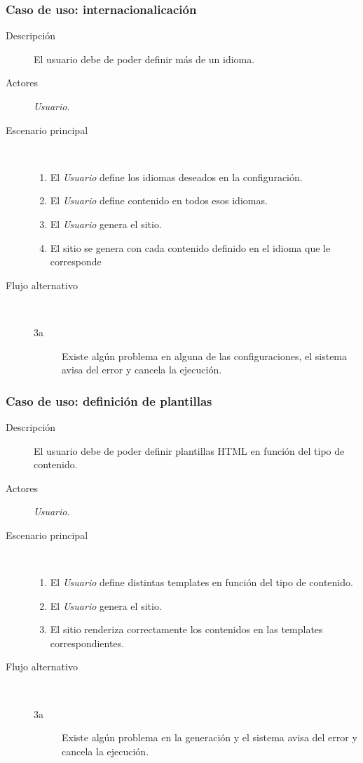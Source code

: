 \subsubsection{Caso de uso: internacionalicación}

\begin{description}
    \item[Descripción] El usuario debe de poder definir más de un idioma.
    \item[Actores] \textit{Usuario}.
    \item[Escenario principal] $\quad$
        \begin{enumerate}
            \item El \textit{Usuario} define los idiomas deseados en la configuración.
            \item El \textit{Usuario} define contenido en todos esos idiomas.
            \item El \textit{Usuario} genera el sitio.
            \item El sitio se genera con cada contenido definido en el idioma que le corresponde
        \end{enumerate}
    \item[Flujo alternativo] $\quad$
        \begin{description}
            \item[3a] Existe algún problema en alguna de las configuraciones, el sistema avisa del error
                y cancela la ejecución.
        \end{description}
\end{description}

\subsubsection{Caso de uso: definición de plantillas}

\begin{description}
    \item[Descripción] El usuario debe de poder definir plantillas HTML en función del tipo de contenido.
    \item[Actores] \textit{Usuario}.
    \item[Escenario principal] $\quad$
        \begin{enumerate}
            \item El \textit{Usuario} define distintas templates en función del tipo de contenido.
            \item El \textit{Usuario} genera el sitio.
            \item El sitio renderiza correctamente los contenidos en las templates correspondientes.
        \end{enumerate}
    \item[Flujo alternativo] $\quad$
        \begin{description}
            \item[3a] Existe algún problema en la generación y el sistema avisa del error
                y cancela la ejecución.
        \end{description}
\end{description}

